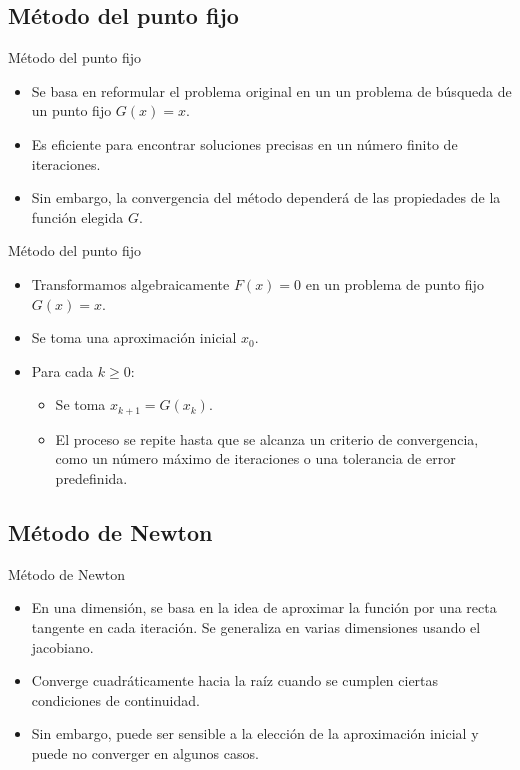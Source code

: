 \documentclass[a4paper,10pt]{beamer}
\begin{document}
\subsection{Método del punto fijo}
\begin{frame}{Método del punto fijo}

\begin{itemize}
	\item Se basa en reformular el problema original en un un problema de búsqueda de un punto fijo $G(x)=x$.
	\pause
	\item Es eficiente para encontrar soluciones precisas en un número finito de iteraciones.
	\pause
	\item Sin embargo, la convergencia del método dependerá de las propiedades de la función elegida $G$.
\end{itemize}
\end{frame}

\begin{frame}{Método del punto fijo}
	\begin{itemize}
		\item Transformamos algebraicamente $F(x)=0$ en un problema de punto fijo $G(x)=x$.
		\item Se toma una aproximación inicial $x_0$.
		\item Para cada $k\geq 0$:
		\begin{itemize}
			\item Se toma $x_{k+1} = G(x_k)$.
			\item El proceso se repite hasta que se alcanza un criterio de convergencia, como un número máximo de iteraciones o una tolerancia de error predefinida.
		\end{itemize}
	\end{itemize}
\end{frame}

\subsection{Método de Newton}
\begin{frame}{Método de Newton}

	\begin{itemize}
\item En una dimensión, se basa en la idea de aproximar la función por una recta tangente en cada iteración. Se generaliza en varias dimensiones usando el jacobiano.
\pause
\item Converge cuadráticamente hacia la raíz cuando se cumplen ciertas condiciones de continuidad.
\pause
\item Sin embargo, puede ser sensible a la elección de la aproximación inicial y puede no converger en algunos casos.
	\end{itemize}
\end{frame}
\end{document}
